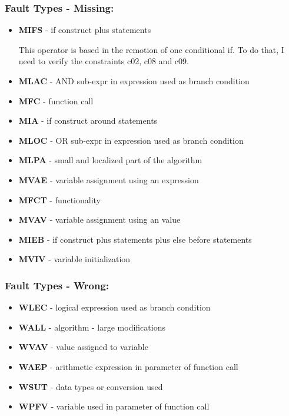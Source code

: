 \subsubsection{Fault Types - Missing:}
\begin{itemize}
	\item \textbf{MIFS} - if construct plus statements

	This operator is based in the remotion of one conditional if. To do that, I need to verify the constraints c02, c08 and c09.


	\item \textbf{MLAC} - AND sub-expr in expression used as branch condition
	\item \textbf{MFC}  - function call
	\item \textbf{MIA}  - if construct around statements
	\item \textbf{MLOC} - OR sub-expr in expression used as branch condition
	\item \textbf{MLPA} - small and localized part of the algorithm
	\item \textbf{MVAE} - variable assignment using an expression
	\item \textbf{MFCT} - functionality
	\item \textbf{MVAV} - variable assignment using an value
	\item \textbf{MIEB} - if construct plus statements plus else before statements
	\item \textbf{MVIV} - variable initialization
\end{itemize}

\subsubsection{Fault Types - Wrong:}
\begin{itemize}
	\item \textbf{WLEC} - logical expression used as branch condition
	\item \textbf{WALL} - algorithm - large modifications
	\item \textbf{WVAV} - value assigned to variable
	\item \textbf{WAEP} - arithmetic expression in parameter of function call
	\item \textbf{WSUT} - data types or conversion used
	\item \textbf{WPFV} - variable used in parameter of function call
\end{itemize}

